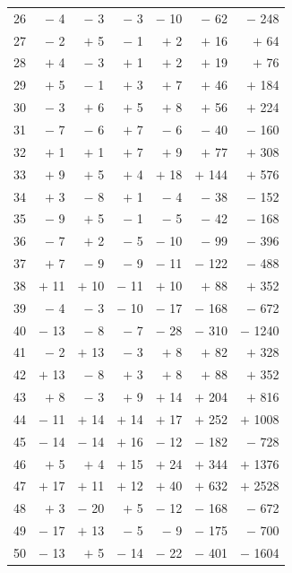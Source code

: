 \documentclass[12pt,a4paper]{article}
\begin{document}
\begin{center}
\begin{tabular}{|r|r|r|r|r|r|r|}
26 & $-$ 4 & $-$ 3 & $-$ 3 & $-$ 10 & $-$ 62 & $-$ 248 \\
27 & $-$ 2 & $+$ 5 & $-$ 1 & $+$ 2 & $+$ 16 & $+$ 64 \\
28 & $+$ 4 & $-$ 3 & $+$ 1 & $+$ 2 & $+$ 19 & $+$ 76 \\
29 & $+$ 5 & $-$ 1 & $+$ 3 & $+$ 7 & $+$ 46 & $+$ 184 \\
30 & $-$ 3 & $+$ 6 & $+$ 5 & $+$ 8 & $+$ 56 & $+$ 224 \\
31 & $-$ 7 & $-$ 6 & $+$ 7 & $-$ 6 & $-$ 40 & $-$ 160 \\
32 & $+$ 1 & $+$ 1 & $+$ 7 & $+$ 9 & $+$ 77 & $+$ 308 \\
33 & $+$ 9 & $+$ 5 & $+$ 4 & $+$ 18 & $+$ 144 & $+$ 576 \\
34 & $+$ 3 & $-$ 8 & $+$ 1 & $-$ 4 & $-$ 38 & $-$ 152 \\
35 & $-$ 9 & $+$ 5 & $-$ 1 & $-$ 5 & $-$ 42 & $-$ 168 \\
36 & $-$ 7 & $+$ 2 & $-$ 5 & $-$ 10 & $-$ 99 & $-$ 396 \\
37 & $+$ 7 & $-$ 9 & $-$ 9 & $-$ 11 & $-$ 122 & $-$ 488 \\
38 & $+$ 11 & $+$ 10 & $-$ 11 & $+$ 10 & $+$ 88 & $+$ 352 \\
39 & $-$ 4 & $-$ 3 & $-$ 10 & $-$ 17 & $-$ 168 & $-$ 672 \\
40 & $-$ 13 & $-$ 8 & $-$ 7 & $-$ 28 & $-$ 310 & $-$ 1240 \\
41 & $-$ 2 & $+$ 13 & $-$ 3 & $+$ 8 & $+$ 82 & $+$ 328 \\
42 & $+$ 13 & $-$ 8 & $+$ 3 & $+$ 8 & $+$ 88 & $+$ 352 \\
43 & $+$ 8 & $-$ 3 & $+$ 9 & $+$ 14 & $+$ 204 & $+$ 816 \\
44 & $-$ 11 & $+$ 14 & $+$ 14 & $+$ 17 & $+$ 252 & $+$ 1008 \\
45 & $-$ 14 & $-$ 14 & $+$ 16 & $-$ 12 & $-$ 182 & $-$ 728 \\
46 & $+$ 5 & $+$ 4 & $+$ 15 & $+$ 24 & $+$ 344 & $+$ 1376 \\
47 & $+$ 17 & $+$ 11 & $+$ 12 & $+$ 40 & $+$ 632 & $+$ 2528 \\
48 & $+$ 3 & $-$ 20 & $+$ 5 & $-$ 12 & $-$ 168 & $-$ 672 \\
49 & $-$ 17 & $+$ 13 & $-$ 5 & $-$ 9 & $-$ 175 & $-$ 700 \\
50 & $-$ 13 & $+$ 5 & $-$ 14 & $-$ 22 & $-$ 401 & $-$ 1604 \\
\hline
\end{tabular}
\end{center}
\end{document}
